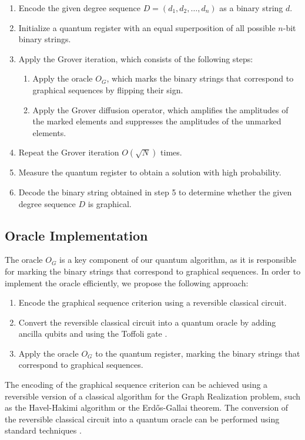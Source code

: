 \begin{enumerate}
  \item Encode the given degree sequence $D = (d_1, d_2, \ldots, d_n)$ as a binary string $d$.
  \item Initialize a quantum register with an equal superposition of all possible $n$-bit binary strings.
  \item Apply the Grover iteration, which consists of the following steps:
  \begin{enumerate}
    \item Apply the oracle $O_G$, which marks the binary strings that correspond to graphical sequences by flipping their sign.
    \item Apply the Grover diffusion operator, which amplifies the amplitudes of the marked elements and suppresses the amplitudes of the unmarked elements.
  \end{enumerate}
  \item Repeat the Grover iteration $O(\sqrt{N})$ times.
  \item Measure the quantum register to obtain a solution with high probability.
  \item Decode the binary string obtained in step 5 to determine whether the given degree sequence $D$ is graphical.
\end{enumerate}

\subsection{Oracle Implementation}

The oracle $O_G$ is a key component of our quantum algorithm, as it is responsible for marking the binary strings that correspond to graphical sequences. In order to implement the oracle efficiently, we propose the following approach:

\begin{enumerate}
  \item Encode the graphical sequence criterion using a reversible classical circuit.
  \item Convert the reversible classical circuit into a quantum oracle by adding ancilla qubits and using the Toffoli gate \cite{toffoli1980reversible}.
  \item Apply the oracle $O_G$ to the quantum register, marking the binary strings that correspond to graphical sequences.
\end{enumerate}

The encoding of the graphical sequence criterion can be achieved using a reversible version of a classical algorithm for the Graph Realization problem, such as the Havel-Hakimi algorithm or the Erdős-Gallai theorem. The conversion of the reversible classical circuit into a quantum oracle can be performed using standard techniques \cite{nielsen2002quantum}.

